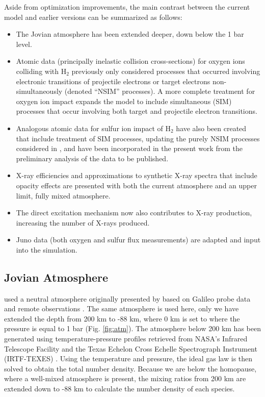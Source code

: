 \documentclass[draft]{agujournal2018}
\begin{document}
Aside from optimization improvements, the main contrast between the current model and earlier versions can be summarized as follows:
\begin{itemize}
\item The Jovian atmosphere has been extended deeper, down below the 1 bar level.
\item Atomic data (principally inelastic collision cross-sections) for oxygen ions colliding with H$_2$ previously \citep{ozak2013,schultz2017} only considered processes that occurred involving electronic transitions of projectile electrons or target electrons non-simultaneously (denoted ``NSIM'' processes).  A more complete treatment for oxygen \citep{schultz2019} ion impact expands the model to include simultaneous (SIM) processes that occur involving both target and projectile electron transitions.
\item Analogous atomic data for sulfur ion impact of H$_2$ have also been created \citep{gharibnejad2019} that include treatment of SIM processes, updating the purely NSIM processes considered in \citet{ozak2013}, and have been incorporated in the present work from the preliminary analysis of the data to be published.
\item X-ray efficiencies and approximations to synthetic X-ray spectra that include opacity effects are presented with both the current atmosphere and an upper limit, fully mixed atmosphere.
\item The direct excitation mechanism now also contributes to X-ray production, increasing the number of X-rays produced.
\item Juno data (both oxygen and sulfur flux measurements) are adapted and input into the simulation.
\end{itemize}

\subsection{Jovian Atmosphere}
\label{sec:atm}

\citet{houston2018} used a neutral atmosphere originally presented by \citet{maurellis2001} based on Galileo probe data \citep{seiff1996,seiff1997} and remote observations \citep{sada1998}.
The same atmosphere is used here, only we have extended the depth from 200 km to -88 km, where 0 km is set to where the pressure is equal to 1 bar (Fig. \ref{fig:atm}).
The atmosphere below 200 km has been generated using temperature-pressure profiles retrieved from NASA's Infrared Telescope Facility and the Texas Echelon Cross Echelle Spectrograph Instrument (IRTF-TEXES) \citep{sinclair2018}.
Using the temperature and pressure, the ideal gas law is then solved to obtain the total number density.
Because we are below the homopause, where a well-mixed atmosphere is present, the mixing ratios from 200 km are extended down to -88 km to calculate the number density of each species.
\end{document}
